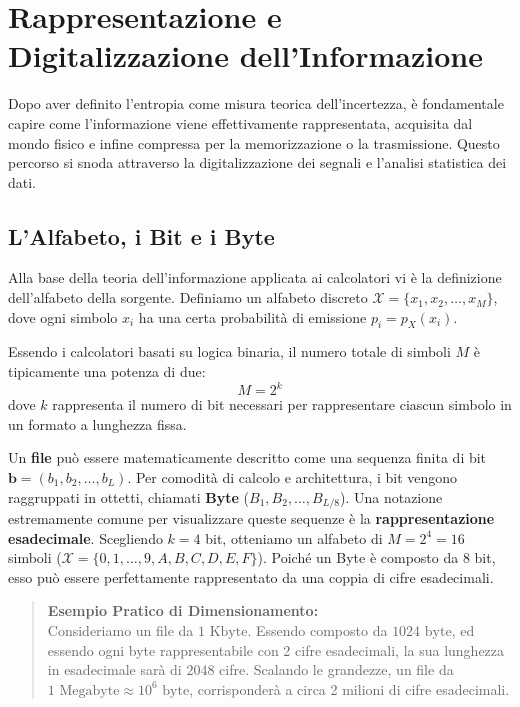 \section{Rappresentazione e Digitalizzazione dell'Informazione}

Dopo aver definito l'entropia come misura teorica dell'incertezza, è fondamentale capire come l'informazione viene effettivamente rappresentata, acquisita dal mondo fisico e infine compressa per la memorizzazione o la trasmissione. Questo percorso si snoda attraverso la digitalizzazione dei segnali e l'analisi statistica dei dati.

\subsection{L'Alfabeto, i Bit e i Byte}

Alla base della teoria dell'informazione applicata ai calcolatori vi è la definizione dell'alfabeto della sorgente. Definiamo un alfabeto discreto $\mathcal{X} = \{x_1, x_2, \dots, x_M\}$, dove ogni simbolo $x_i$ ha una certa probabilità di emissione $p_i = p_X(x_i)$.

Essendo i calcolatori basati su logica binaria, il numero totale di simboli $M$ è tipicamente una potenza di due:
\begin{equation}
M = 2^k
\end{equation}
dove $k$ rappresenta il numero di bit necessari per rappresentare ciascun simbolo in un formato a lunghezza fissa. 

Un \textbf{file} può essere matematicamente descritto come una sequenza finita di bit $\mathbf{b} = (b_1, b_2, \dots, b_L)$. Per comodità di calcolo e architettura, i bit vengono raggruppati in ottetti, chiamati \textbf{Byte} ($B_1, B_2, \dots, B_{L/8}$). 
Una notazione estremamente comune per visualizzare queste sequenze è la \textbf{rappresentazione esadecimale}. Scegliendo $k=4$ bit, otteniamo un alfabeto di $M = 2^4 = 16$ simboli ($\mathcal{X} = \{0,1,\dots,9,A,B,C,D,E,F\}$). Poiché un Byte è composto da 8 bit, esso può essere perfettamente rappresentato da una coppia di cifre esadecimali.

\begin{quote}
\textbf{Esempio Pratico di Dimensionamento:} \\
Consideriamo un file da $1 \text{ Kbyte}$. Essendo composto da $1024 \text{ byte}$, ed essendo ogni byte rappresentabile con 2 cifre esadecimali, la sua lunghezza in esadecimale sarà di $2048$ cifre. Scalando le grandezze, un file da $1 \text{ Megabyte} \approx 10^6 \text{ byte}$, corrisponderà a circa 2 milioni di cifre esadecimali.
\end{quote}

